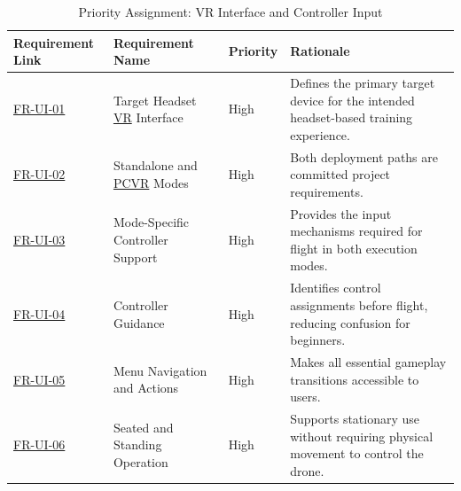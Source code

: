 \documentclass[12pt]{article}
\begin{document}
\begin{table}[htbp]
\centering
\small
\caption{Priority Assignment: VR Interface and Controller Input}
\label{tab:priority-interface}
\begin{tabular}{p{2.1cm} p{2.7cm} p{1.3cm} p{7.0cm}}
\hline
\textbf{Requirement Link} & \textbf{Requirement Name} & \textbf{Priority} & \textbf{Rationale} \\
\hline
\hyperref[sec:s2-interface]{FR-UI-01} & Target Headset \hyperlink{glos:VR}{VR} Interface & High & Defines the primary target device for the intended headset-based training experience. \\
\hyperref[sec:s2-interface]{FR-UI-02} & Standalone and \hyperlink{glos:PCVR}{PCVR} Modes & High & Both deployment paths are committed project requirements. \\
\hyperref[sec:s2-interface]{FR-UI-03} & Mode-Specific Controller Support & High & Provides the input mechanisms required for flight in both execution modes. \\
\hyperref[sec:s2-interface]{FR-UI-04} & Controller Guidance & High & Identifies control assignments before flight, reducing confusion for beginners. \\
\hyperref[sec:s2-interface]{FR-UI-05} & Menu Navigation and Actions & High & Makes all essential gameplay transitions accessible to users. \\
\hyperref[sec:s2-interface]{FR-UI-06} & Seated and Standing Operation & High & Supports stationary use without requiring physical movement to control the drone. \\
\hline
\end{tabular}
\end{table}
\end{document}
